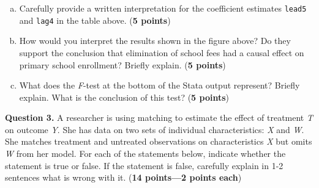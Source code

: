 \documentclass[12pt]{article}
\begin{document}
\begin{enumerate}[(a)]
\setlength\itemsep{2em}
\setcounter{enumi}{2}

\item Carefully provide a written interpretation for the coefficient estimates \texttt{lead5} and \texttt{lag4} in the table above. ({\bf 5 points})

\item How would you interpret the results shown in the figure above? Do they support the conclusion that elimination of school fees had a causal effect on primary school enrollment? Briefly explain. ({\bf 5 points})

\item What does the \textit{F}-test at the bottom of the Stata output represent? Briefly explain. What is the conclusion of this test? ({\bf 5 points})
\end{enumerate}


\pagebreak

\textbf{Question 3.} A researcher is using matching to estimate the effect of treatment \textit{T} on outcome \textit{Y}. She has data on two sets of individual characteristics: \textit{X} and \textit{W}. She matches treatment and untreated observations on characteristics \textit{X} but omits \textit{W} from her model. For each of the statements below, indicate whether the statement is true or false. If the statement is false, carefully explain in 1-2 sentences what is wrong with it. ({\bf 14 points---2 points each})
\end{document}
